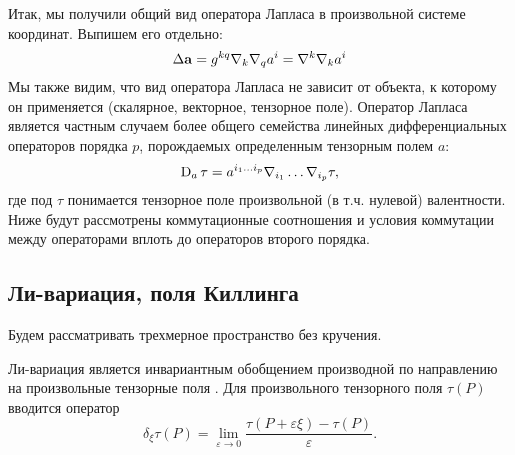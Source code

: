 \documentclass[12pt,a4paper]{article}
\begin{document}
        Итак, мы получили общий вид оператора Лапласа в произвольной системе координат. Выпишем его отдельно:
        \begin{equation}
            \Delta{\mathbf{a}} = g^{kq} \nabla_k \nabla_{q} a^i
                          = \nabla^k \nabla_k a^i
        \end{equation}
        Мы также видим, что вид оператора Лапласа не зависит от объекта, к которому он применяется (скалярное, векторное, тензорное поле). Оператор Лапласа является частным случаем более общего семейства линейных дифференциальных операторов порядка $p$, порождаемых определенным тензорным полем $a$:
        \begin{equation}
            \operatorname{D}_a\tau = a^{i_1 \dots i_p} \nabla_{i_1} \dots \nabla_{i_p} \tau ,
        \end{equation}
        где под $\tau$ понимается тензорное поле произвольной (в т.ч. нулевой) валентности. Ниже будут рассмотрены коммутационные соотношения и условия коммутации между операторами вплоть до операторов второго порядка.


    \subsection{Ли-вариация, поля Киллинга}

        Будем рассматривать трехмерное пространство без кручения\footnotemark{}.


        Ли-вариация является инвариантным обобщением производной по направлению на произвольные тензорные поля \cite{lie_derivative_theory,symmetry_and_killing_fields}. Для произвольного тензорного поля $\tau(P)$ вводится оператор
        \begin{equation}
            \delta_\xi \tau(P) = \lim\limits_{\varepsilon \to 0} \frac{
                \tau(P + \varepsilon \xi) - \tau(P)
            }{\varepsilon}.
        \end{equation}
\end{document}
